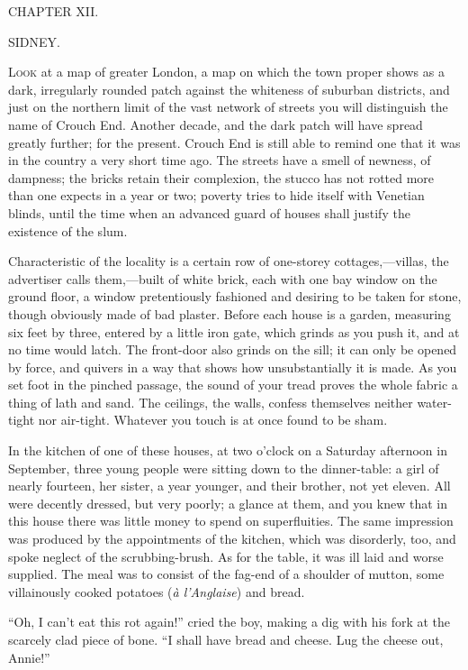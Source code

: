 {}

{CHAPTER XII.}

{SIDNEY.}

\textsc{Look} at a map of greater London, a map on which the town proper
shows as a dark, irregularly rounded patch against the whiteness of
suburban districts, and just on the northern limit of the vast network
of streets you will distinguish the name of Crouch End. Another decade,
and the dark patch will have spread greatly further; for the present.
Crouch End is still able to remind one that it was in the country a very
short time ago. The streets have a smell of newness, of dampness; the
bricks retain their complexion, the stucco has not rotted more than one
expects in a year or two; poverty tries to hide itself with Venetian
blinds, until the time when an advanced guard of houses shall justify
the existence of the slum.

Characteristic of the locality is a certain row of one-storey
cottages,---villas, the {}advertiser calls them,---built of white brick,
each with one bay window on the ground floor, a window pretentiously
fashioned and desiring to be taken for stone, though obviously made of
bad plaster. Before each house is a garden, measuring six feet by three,
entered by a little iron gate, which grinds as you push it, and at no
time would latch. The front-door also grinds on the sill; it can only be
opened by force, and quivers in a way that shows how unsubstantially it
is made. As you set foot in the pinched passage, the sound of your tread
proves the whole fabric a thing of lath and sand. The ceilings, the
walls, confess themselves neither water-tight nor air-tight. Whatever
you touch is at once found to be sham.

In the kitchen of one of these houses, at two o'clock on a Saturday
afternoon in September, three young people were sitting down to the
dinner-table: a girl of nearly fourteen, her sister, a year younger, and
their brother, not yet eleven. All were decently dressed, but very
poorly; a glance at them, and you knew that in this house there was
little money to spend on superfluities. The same impression {}was
produced by the appointments of the kitchen, which was disorderly, too,
and spoke neglect of the scrubbing-brush. As for the table, it was ill
laid and worse supplied. The meal was to consist of the fag-end of a
shoulder of mutton, some villainously cooked potatoes (\emph{à
l'Anglaise}) and bread.

``Oh, I can't eat this rot again!'' cried the boy, making a dig with his
fork at the scarcely clad piece of bone. ``I shall have bread and
cheese. Lug the cheese out, Annie!''

